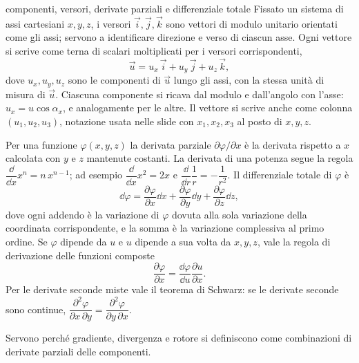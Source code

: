 \documentclass[main.tex]{subfiles}
\begin{document}
\renewcommand{\richiamoprefix}{Richiamo di Matematica --- }
\begin{riquadro}{componenti, versori, derivate parziali e differenziale totale}
Fissato un sistema di assi cartesiani $x,y,z$, i versori $\vec i,\vec j,\vec k$ sono vettori di modulo unitario orientati come gli assi; servono a identificare direzione e verso di ciascun asse. Ogni vettore si scrive come terna di scalari moltiplicati per i versori corrispondenti,
\[
\vec u = u_x\,\vec i + u_y\,\vec j + u_z\,\vec k ,
\]
dove $u_x,u_y,u_z$ sono le componenti di $\vec u$ lungo gli assi, con la stessa unità di misura di $\vec u$. Ciascuna componente si ricava dal modulo e dall'angolo con l'asse: $u_x=u\cos\alpha_x$, e analogamente per le altre. Il vettore si scrive anche come colonna $(u_1,u_2,u_3)$, notazione usata nelle slide con $x_1,x_2,x_3$ al posto di $x,y,z$.

Per una funzione $\varphi(x,y,z)$ la derivata parziale $\partial\varphi/\partial x$ è la derivata rispetto a $x$ calcolata con $y$ e $z$ mantenute costanti. La derivata di una potenza segue la regola $\dfrac{\dd}{\dd x}x^n=n\,x^{n-1}$; ad esempio $\dfrac{\dd}{\dd x}x^2=2x$ e $\dfrac{\dd}{\dd r}\dfrac1r=-\dfrac1{r^2}$. Il differenziale totale di $\varphi$ è
\[
\dd\varphi=\frac{\partial\varphi}{\partial x}\dd x+\frac{\partial\varphi}{\partial y}\dd y+\frac{\partial\varphi}{\partial z}\dd z ,
\]
dove ogni addendo è la variazione di $\varphi$ dovuta alla sola variazione della coordinata corrispondente, e la somma è la variazione complessiva al primo ordine. Se $\varphi$ dipende da $u$ e $u$ dipende a sua volta da $x,y,z$, vale la regola di derivazione delle funzioni composte
\[
\frac{\partial\varphi}{\partial x}=\frac{\dd\varphi}{\dd u}\frac{\partial u}{\partial x}.
\]
Per le derivate seconde miste vale il teorema di Schwarz: se le derivate seconde sono continue, $\dfrac{\partial^2\varphi}{\partial x\,\partial y}=\dfrac{\partial^2\varphi}{\partial y\,\partial x}$.

Servono perché gradiente, divergenza e rotore si definiscono come combinazioni di derivate parziali delle componenti.
\end{riquadro}
\end{document}
